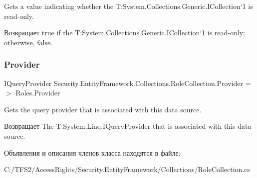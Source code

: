 Gets a value indicating whether the T\+:\+System.\+Collections.\+Generic.\+I\+Collection`1 is read-\/only. 

\begin{DoxyReturn}{Возвращает}
true if the T\+:\+System.\+Collections.\+Generic.\+I\+Collection`1 is read-\/only; otherwise, false. 
\end{DoxyReturn}
\mbox{\label{class_security_1_1_entity_framework_1_1_collections_1_1_role_collection_a0eaa9ba565c760aa89b8c5cfe9482c73}} 
\subsubsection{\texorpdfstring{Provider}{Provider}}
{\footnotesize\ttfamily I\+Query\+Provider Security.\+Entity\+Framework.\+Collections.\+Role\+Collection.\+Provider =$>$ Roles.\+Provider}



Gets the query provider that is associated with this data source. 

\begin{DoxyReturn}{Возвращает}
The T\+:\+System.\+Linq.\+I\+Query\+Provider that is associated with this data source. 
\end{DoxyReturn}


Объявления и описания членов класса находятся в файле\+:\begin{DoxyCompactItemize}
\item 
C\+:/\+T\+F\+S2/\+Access\+Rights/\+Security.\+Entity\+Framework/\+Collections/Role\+Collection.\+cs\end{DoxyCompactItemize}
